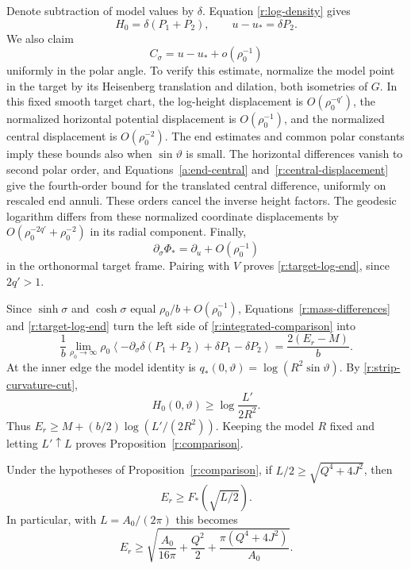 Denote subtraction of model values by $\delta$.  Equation
\eqref{r:log-density} gives
\begin{equation}\label{r:mass-differences}
 H_0=\delta(P_1+P_2),\qquad u-u_*=\delta P_2.
\end{equation}
We also claim
\begin{equation}\label{r:target-log-end}
 C_\sigma=u-u_*+o(\rho_0^{-1})
\end{equation}
uniformly in the polar angle.  To verify this estimate, normalize the
model point in the target by its Heisenberg translation and dilation,
both isometries of $G$.  In this fixed smooth target chart, the log-height
displacement is $O(\rho_0^{-q'})$, the normalized horizontal potential
displacement is $O(\rho_0^{-1})$, and the normalized central displacement
is $O(\rho_0^{-2})$.  The end estimates and common polar constants imply
these bounds also when $\sin\vartheta$ is small.  The horizontal
differences vanish to second polar order, and
Equations~\eqref{a:end-central} and~\eqref{r:central-displacement}
give the fourth-order bound for the translated central difference,
uniformly on rescaled end annuli.  These orders cancel the inverse
height factors.
The geodesic logarithm differs from these normalized coordinate
displacements by
$O(\rho_0^{-2q'}+\rho_0^{-2})$ in its radial component.  Finally,
\[
 \partial_\sigma\Phi_* =\partial_u+O(\rho_0^{-1})
\]
in the orthonormal target frame.  Pairing with $V$ proves
\eqref{r:target-log-end}, since $2q'>1$.

Since $\sinh\sigma$ and $\cosh\sigma$ equal
$\rho_0/b+O(\rho_0^{-1})$, Equations~\eqref{r:mass-differences}
and \eqref{r:target-log-end} turn the left side of
\eqref{r:integrated-comparison} into
\[
 \frac1b\lim_{\rho_0\to\infty}\rho_0
 \left\langle-\partial_\sigma\delta(P_1+P_2)
                    +\delta P_1-\delta P_2\right\rangle
 =\frac{2(E_r-M)}b.
\]
At the inner edge the model identity is
$q_*(0,\vartheta)=\log(R^2\sin\vartheta)$.  By
\eqref{r:strip-curvature-cut},
\[
 H_0(0,\vartheta)\ge\log\frac{L'}{2R^2}.
\]
Thus $E_r\ge M+(b/2)\log(L'/(2R^2))$.  Keeping the model $R$ fixed
and letting $L'\uparrow L$ proves Proposition~\ref{r:comparison}.

\begin{corollary}\label{r:optimized}
Under the hypotheses of Proposition~\ref{r:comparison}, if
$L/2\ge\sqrt{Q^4+4J^2}$, then
\begin{equation}\label{r:optimized-bound}
 E_r\ge F_*\!\left(\sqrt{L/2}\right).
\end{equation}
In particular, with $L=A_0/(2\pi)$ this becomes
\[
 E_r\ge\sqrt{\frac{A_0}{16\pi}+\frac{Q^2}{2}
                  +\frac{\pi(Q^4+4J^2)}{A_0}}.
\]
\end{corollary}

